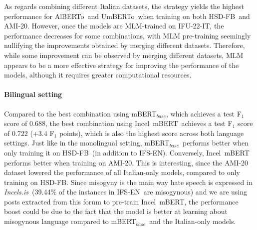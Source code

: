 \documentclass[11pt]{article}
\newcommand{\dsITcorpus}{IFU-22-IT}
\newcommand{\dsENclassification}{IFS-EN}
\newcommand{\mbert}{\mbox{mBERT$_{base}$}}
\newcommand{\imbert}{\mbox{Incel mBERT}}
\newcommand{\umbert}{\mbox{UmBERTo}}
\newcommand{\albert}{\mbox{AlBERTo}}
\newcommand{\iumbert}{\mbox{Incel UmBERTo}}
\newcommand{\ialbert}{\mbox{Incel AlBERTo}}
\newcommand{\hsdfb}{\mbox{HSD-FB}}
\newcommand{\hsdtw}{\mbox{HSD-TW}}
\newcommand{\ami}{\mbox{AMI-20}}
\newcommand{\enforum}{\textit{Incels.is}}
\begin{document}
As regards combining different Italian datasets, the strategy yields the highest performance for \albert\, and \umbert\, when training on both \hsdfb\, and \ami.
However, once the models are MLM-trained on \dsITcorpus, the performance decreases for some combinations, with MLM pre-training seemingly nullifying the improvements obtained by merging different datasets. Therefore, while some improvement can be observed by merging different datasets, MLM appears to be a more effective strategy for improving the performance of the models, although it requires greater computational resources.

\paragraph{Bilingual setting}
Compared to the best combination using \mbert, which achieves a test F$_1$ score of 0.688, the best combination using \imbert\, achieves a test F$_1$ score of 0.722 (+3.4 F$_1$ points), which is also the highest score across both language settings. Just like in the monolingual setting, \mbert\, performs better when only training it on \hsdfb\, (in addition to \dsENclassification). Conversely, \imbert\, performs better when training on \ami. This is interesting, since the \ami\, dataset lowered the performance of all Italian-only models, compared to only training on \hsdfb. Since misogyny is the main way hate speech is expressed in \enforum\, (39.44\% of the instances in \dsENclassification\, are misogynous) and
we are using posts extracted from this forum to pre-train \imbert, the performance boost could be due to the fact that the model is better at learning about misogynous language compared to \mbert\, and the Italian-only models.
\end{document}
